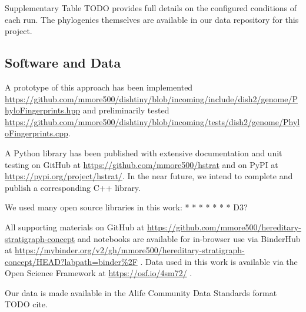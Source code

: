 Supplementary Table TODO provides full details on the configured conditions of each run.
The phylogenies themselves are available in our data repository for this project.


\subsection{Software and Data}

A prototype of this approach has been implemented \url{https://github.com/mmore500/dishtiny/blob/incoming/include/dish2/genome/PhyloFingerprints.hpp} and preliminarily tested \url{https://github.com/mmore500/dishtiny/blob/incoming/tests/dish2/genome/PhyloFingerprints.cpp}.

A Python library has been published with extensive documentation and unit testing on GitHub at \url{https://github.com/mmore500/hstrat} and on PyPI at \url{https://pypi.org/project/hstrat/}.
In the near future, we intend to complete and publish a corresponding C++ library.

We used many open source libraries in this work:
* \citep{sukumaran2010dendropy}
* \citep{cock2009biopython}
* \citep{virtanen2020scipy}
* \citep{hunter2007matplotlib}
* \citep{virtanen2020scipy}
* \citep{waskom2021seaborn}
* D3?

All supporting materials on GitHub at \url{https://github.com/mmore500/hereditary-stratigraph-concept} and notebooks are available for in-browser use via BinderHub at \url{https://mybinder.org/v2/gh/mmore500/hereditary-stratigraph-concept/HEAD?labpath=binder%2F} \citep{ragan2018binder}.
Data used in this work is available via the Open Science Framework at
\url{https://osf.io/4sm72/} \citep{hstratconceptsupplement} \citep{foster2017open}.

Our data is made available in the Alife Community Data Standards format TODO cite.






